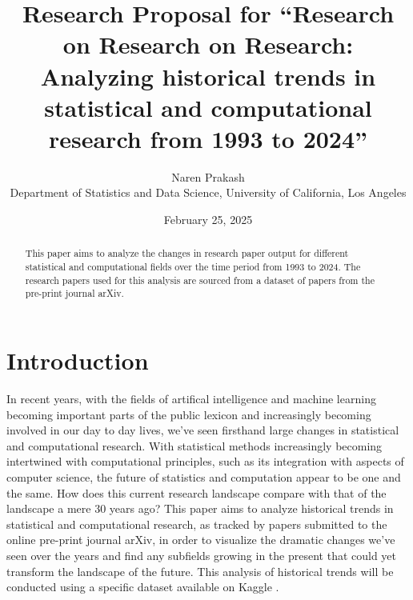 \documentclass[
  12pt]{article}
\begin{document}
\def\spacingset#1{\renewcommand{\baselinestretch}%
{#1}\small\normalsize} \spacingset{1}



\date{February 25, 2025}
\title{\bf Research Proposal for ``Research on Research on Research:
Analyzing historical trends in statistical and computational research
from 1993 to 2024''}
\author{
Naren Prakash\\
Department of Statistics and Data Science, University of California, Los
Angeles\\
}
\maketitle

\bigskip
\bigskip
\begin{abstract}
This paper aims to analyze the changes in research paper output for
different statistical and computational fields over the time period from
1993 to 2024. The research papers used for this analysis are sourced
from a dataset of papers from the pre-print journal arXiv.
\end{abstract}


\newpage
\spacingset{1.9} %


\section{Introduction}\label{sec-intro}

In recent years, with the fields of artifical intelligence and machine
learning becoming important parts of the public lexicon and increasingly
becoming involved in our day to day lives, we've seen firsthand large
changes in statistical and computational research. With statistical
methods increasingly becoming intertwined with computational principles,
such as its integration with aspects of computer science, the future of
statistics and computation appear to be one and the same. How does this
current research landscape compare with that of the landscape a mere 30
years ago? This paper aims to analyze historical trends in statistical
and computational research, as tracked by papers submitted to the online
pre-print journal arXiv, in order to visualize the dramatic changes
we've seen over the years and find any subfields growing in the present
that could yet transform the landscape of the future. This analysis of
historical trends will be conducted using a specific dataset available
on Kaggle \citet{arXiv:kaggle:data}.
\end{document}
